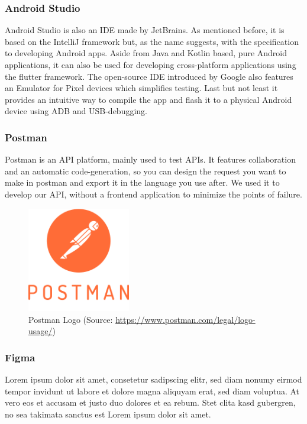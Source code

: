 \subsubsection{Android Studio}
Android Studio is also an IDE made by JetBrains. As mentioned before, it is based on the IntelliJ framework but, as the name suggests, with the specification to developing Android apps. Aside from Java and Kotlin based, pure Android applications, it can also be used for developing cross-platform applications using the flutter framework. The open-source IDE introduced by Google also features an Emulator for Pixel devices which simplifies testing. Last but not least it provides an intuitive way to compile the app and flash it to a physical Android device using ADB and USB-debugging. 

\subsubsection{Postman}
Postman is an API platform, mainly used to test APIs.  It features collaboration and an automatic code-generation, so you can design the request you want to make in postman and export it in the language you use after. We used it to develop our API, without a frontend application to minimize the points of failure.

\begin{figure} [H]
    \center
    \includegraphics [width=0.4\textwidth] {images/Technologies/postmanLogo.png}
    \caption{Postman Logo (Source: \url{https://www.postman.com/legal/logo-usage/})}
\end{figure}


\subsubsection{Figma}
Lorem ipsum dolor sit amet, consetetur sadipscing elitr, sed diam nonumy eirmod tempor invidunt ut labore et dolore magna aliquyam erat, sed diam voluptua. At vero eos et accusam et justo duo dolores et ea rebum. Stet clita kasd gubergren, no sea takimata sanctus est Lorem ipsum dolor sit amet.

